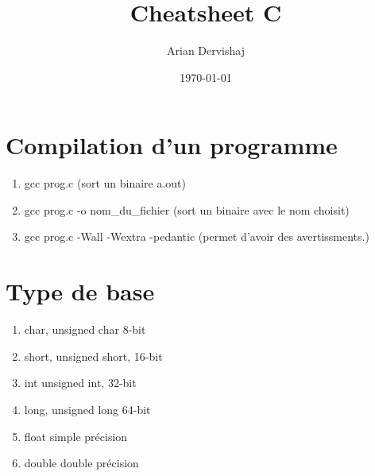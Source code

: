 \documentclass[12pt]{article}
\title{Cheatsheet C}
\author{Arian Dervishaj}
\date{\today}
\begin{document}
\maketitle
\pagebreak

\section{Compilation d'un programme}
\begin{enumerate}
    \item gcc prog.c (sort un binaire a.out)
    \item gcc prog.c -o nom\_du\_fichier (sort un binaire avec le nom choisit)
    \item gcc prog.c -Wall -Wextra -pedantic (permet d'avoir des avertissments.)
\end{enumerate}

\section{Type de base}
\begin{enumerate}
    \item char, unsigned char         8-bit
    \item short, unsigned short,      16-bit
    \item int unsigned int,           32-bit
    \item long, unsigned long         64-bit
    \item float                       simple précision
    \item double                      double précision

\end{enumerate}
\end{document}
